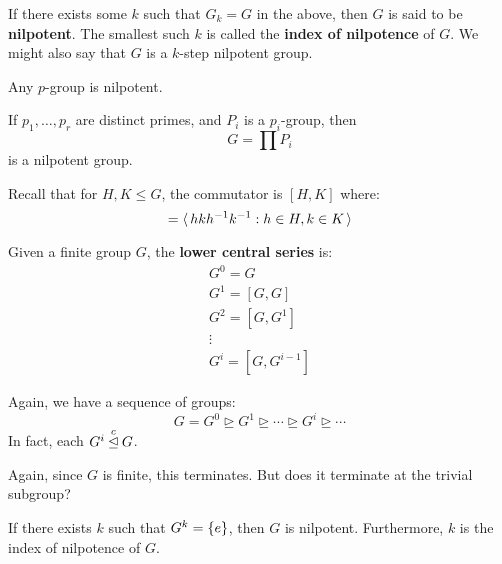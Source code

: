\newpage
\begin{defn}
    If there exists some $ k $ such that $ G_{k} = G $ in the above,
    then $ G $ is said to be \textbf{nilpotent}. \vsp
    The smallest such $ k $ is called the \textbf{index of nilpotence} of $ G $.
    We might also say that $ G $ is a $ k $-step nilpotent group.
\end{defn}

\begin{crll}
    Any $ p $-group is nilpotent.
\end{crll}

\begin{crll}
    If $ p_{1}, \dots, p_{r} $ are distinct primes, and $ P_{i} $ is a $ p_{i} $-group, then
    \begin{equation*}
        G = \prod P_{i}
    \end{equation*}
    is a nilpotent group.
\end{crll}

Recall that for $ H, K \leq G $, the commutator is $ [H, K] $ where:
\begin{equation*}
    [H, K] = \la hkh^{-1}k^{-1} : h \in H, k \in K \ra
\end{equation*}

\begin{defn}
    Given a finite group $ G $, the \textbf{lower central series} is:
    \begin{gather*}
        G^{0} = G \\
        G^{1} = [G, G] \\
        G^{2} = [G, G^{1}] \\
        \vdots \\
        G^{i} = [G, G^{i-1}]
    \end{gather*}
\end{defn}

Again, we have a sequence of groups:
\begin{equation*}
    G = G^{0} \trianglerighteq G^{1} \trianglerighteq \cdots \trianglerighteq
    G^{i} \trianglerighteq \cdots
\end{equation*}
In fact, each $ G^{i} \: \overset{c}{\operatorname{\trianglelefteq}} \: G $.

Again, since $ G $ is finite, this terminates.
But does it terminate at the trivial subgroup?

\begin{lm}
    If there exists $ k $ such that $ G^{k} = \left\{{e}\right\} $, then $ G $ is nilpotent.
    Furthermore, $ k $ is the index of nilpotence of $ G $.
\end{lm}

